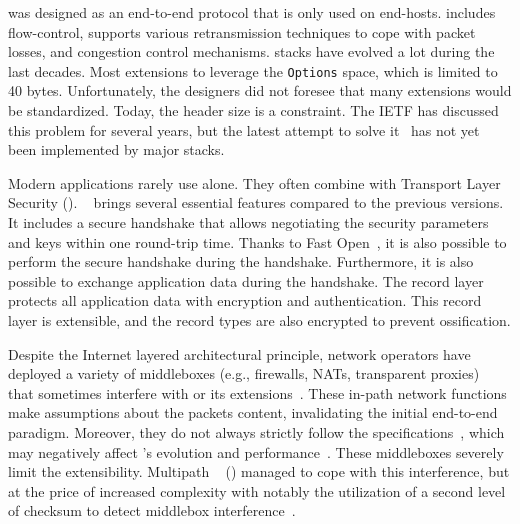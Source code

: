 
\tcp was designed as an end-to-end protocol that is only used on end-hosts.
\tcp includes flow-control, supports various retransmission techniques to cope
with packet losses, and congestion control mechanisms. \tcp stacks have evolved
a lot during the last decades. Most extensions to \tcp leverage the \tcp
\texttt{Options} space, which is limited to 40 bytes. Unfortunately, the \tcp
designers did not foresee that many \tcp extensions would be standardized.
Today, the \tcp header size is a constraint. The IETF has discussed this
problem for several years, but the latest attempt to solve
it~\cite{draft-ietf-tcpm-tcp-edo-10} has not yet been implemented by major
\tcp stacks.

Modern applications rarely use \tcp alone. They often combine \tcp with Transport Layer Security (\tls). ~\cite{rfc8446} brings several essential features compared to the previous versions. It includes a secure handshake that allows negotiating the security parameters and keys within one round-trip time. Thanks to \tcp Fast Open~\cite{radhakrishnan2011tcp}, it is also possible to perform the secure handshake during the \tcp handshake. Furthermore, it is also possible to exchange application data during the handshake. The  record layer protects all application data with encryption and authentication. This record layer is extensible, and the \tls record types are also encrypted to prevent ossification.

Despite the Internet layered architectural principle, network operators have 
deployed a variety
of middleboxes (e.g., firewalls, NATs, transparent proxies)~\cite{mCloud} that
sometimes interfere with \tcp or its extensions~\cite{medina2004measuring,
honda2011still, edeline2019bottom}. These in-path network functions make
assumptions about the \tcp packets content, invalidating the initial \tcp
end-to-end paradigm. Moreover, they do not always strictly follow the
\tcp specifications~\cite{honda2011still, hesmans2013tcp}, which may negatively
affect \tcp's evolution and performance~\cite{edeline2020evaluating}. These
middleboxes severely limit the \tcp extensibility. Multipath \tcp~\cite{rfc8684,raiciu2012hard} (\mptcp) managed to cope with this interference, but at the price of increased complexity with notably the utilization of a second level of checksum to detect middlebox interference~\cite{raiciu2012hard,hesmans2013tcp}.

